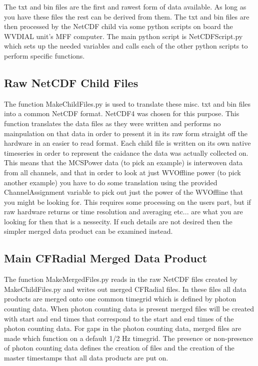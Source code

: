 The txt and bin files are the first and rawest form of data available. As long as you have these files the rest can be derived from them. The txt and bin files are then processed by the NetCDF child via some python scripts on board the WVDIAL unit's MFF computer. The main python script is NetCDFScript.py which sets up the needed variables and calls each of the other python scripts to perform specific functions. 

\subsection{Raw NetCDF Child Files}

The function MakeChildFiles.py is used to translate these misc. txt and bin files into a common NetCDF format. NetCDF4 was chosen for this purpose. This function translates the data files as they were written and performs no mainpulation on that data in order to present it in its raw form straight off the hardware in an easier to read format. Each child file is written on its own native timeseries in order to represent the caidance the data was actually collected on. This means that the MCSPower data (to pick an example) is interwoven data from all channels, and that in order to look at just WVOffline power (to pick another example) you have to do some translation using the provided ChannelAssignment variable to pick out just the power of the WVOffline that you might be looking for. This requires some processing on the users part, but if raw hardware returns or time resolution and averaging etc... are what you are looking for then that is a nessecity. If such details are not desired then the simpler merged data product can be examined instead. 

\subsection{Main CFRadial Merged Data Product}

The function MakeMergedFiles.py reads in the raw NetCDF files created by MakeChildFiles.py and writes out merged CFRadial files. In these files all data products are merged onto one common timegrid which is defined by photon counting data. When photon counting data is present merged files will be created with start and end times that correspond to the start and end times of the photon counting data. For gaps in the photon counting data, merged files are made which function on a default 1/2 Hz timegrid. The presence or non-presence of photon counting data defines the creation of files and the creation of the master timestamps that all data products are put on. 

